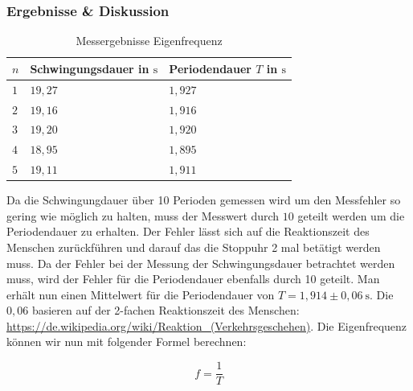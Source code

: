         \subsubsection{Ergebnisse \& Diskussion}

            \begin{table}[H]
                \centering
                \caption{Messergebnisse Eigenfrequenz}
                \vspace{0.5em}
                \begin{tabular}{|l|l|l|}
                    \hline
                    $n$ & Schwingungsdauer in $\mathrm{s}$ & Periodendauer $T$ in $\mathrm{s}$\\
                    \hline
                    \hline
                    $1$ & $19,27$ & $1,927$ \\
                    \hline
                    $2$ & $19,16$ & $1,916$ \\
                    \hline
                    $3$ & $19,20$ & $1,920$ \\
                    \hline
                    $4$ & $18,95$ & $1,895$ \\
                    \hline
                    $5$ & $19,11$ & $1,911$ \\
                    \hline
                \end{tabular}
                \label{tab:Eigenfrequenz}
            \end{table}

            Da die Schwingungdauer über 10 Perioden gemessen wird um den Messfehler so gering wie möglich zu halten, muss der Messwert durch $10$ geteilt werden um die Periodendauer zu erhalten. Der Fehler lässt sich auf die Reaktionszeit des Menschen zurückführen und darauf das die Stoppuhr 2 mal betätigt werden muss. Da der Fehler bei der Messung der Schwingungsdauer betrachtet werden muss, wird der Fehler für die Periodendauer ebenfalls durch 10 geteilt.
            Man erhält nun einen Mittelwert für die Periodendauer von $T = 1,914 \pm 0,06\ \mathrm{s}$. Die $0,06$ basieren auf der 2-fachen Reaktionszeit des Menschen: \url{https://de.wikipedia.org/wiki/Reaktion_(Verkehrsgeschehen)}.
            Die Eigenfrequenz können wir nun mit folgender Formel berechnen:

            \begin{equation}
                f = \frac{1}{T}
                \label{eq:Frequenz}
            \end{equation}

